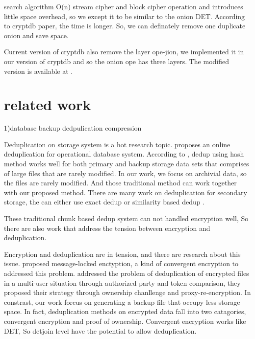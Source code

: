 search\citep{song2000practical} algorithm O(n) stream cipher and block cipher operation and introduces little space overhead, so we except it to be similar to the onion DET. According to cryptdb paper, the time is longer. So, we can definately remove one duplicate onion and save space.


Current version of cryptdb also remove the layer ope-jion, we implemented it in our version of cryptdb and so the onion ope has three layers. The modified version is available at \citep{practical-cryptdb}. 





\section{related work}

1)database backup dedpulication compression

Deduplication on storage system is a hot research topic\citep{paulo2014survey}.\citep{xu2017online} proposes an online deduplication for operational database system. According to \citep{xu2017online}, dedup using hash method works well for both primary and backup storage data sets that comprises of large files that are rarely modified. In our work, we focus on archivial data, so the files are rarely modified. And those traditional method can work together with our proposed method. There are many work on deduplication for secondary storage, the can either use exact dedup\citep{dubnicki2009hydrastor} or similarity based dedup\citep{xu2015reducing} \citep{aronovich2009design}\citep{you2005deep}.

These traditional chunk based dedup system can not handled encryption well, So there are also work that address the tension between encryption and deduplication. 

Encryption and deduplication are in tension, and there are research about this issue.\citep{bellare2013message} \citep{puzio2015perfectdedup} proposed message-locked enctyption, a kind of convergent encryption to addressed this problem. \citep{yan2016deduplication} addressed the problem of deduplication of encrypted files in a multi-user situation through authorized party and token comparison, they proposed their strategy through ownership chanllenge and proxy-re-encryption. In constrast, our work forcus on generating a backup file that occupy less storage space. In fact, deduplication methods on encrypted data fall into two catagories, convergent encryption and proof of ownership\citep{akhila2016study}. Convergent encryption works like DET, So detjoin level have the potential to allow deduplication.

